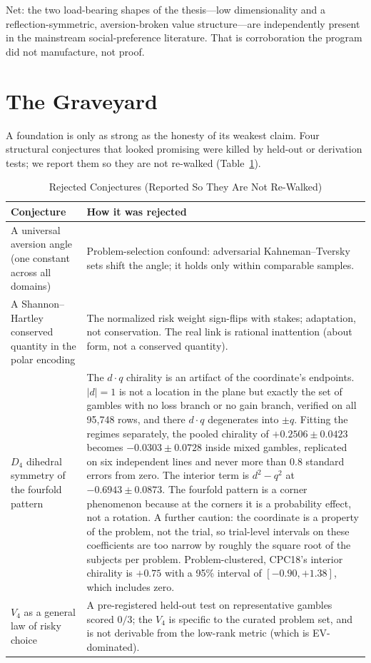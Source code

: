 \documentclass[journal]{IEEEtran}
\begin{document}
Net: the two load-bearing shapes of the thesis---low dimensionality and a reflection-symmetric, aversion-broken value structure---are independently present in the mainstream social-preference literature.
That is corroboration the program did not manufacture, not proof.

\section{The Graveyard}
\label{sec:graveyard}

A foundation is only as strong as the honesty of its weakest claim.
Four structural conjectures that looked promising were killed by held-out or derivation tests; we report them so they are not re-walked (Table~\ref{tab:graveyard}).

\begin{table}[!t]
\renewcommand{\arraystretch}{1.2}
\caption{Rejected Conjectures (Reported So They Are Not Re-Walked)}
\label{tab:graveyard}
\centering
\begin{tabular}{@{}p{} p{}@{}}
\toprule
\textbf{Conjecture} & \textbf{How it was rejected} \\
\midrule
A universal aversion angle (one constant across all domains) & Problem-selection confound: adversarial Kahneman--Tversky sets shift the angle; it holds only within comparable samples. \\
A Shannon--Hartley conserved quantity in the polar encoding & The normalized risk weight sign-flips with stakes; adaptation, not conservation. The real link is rational inattention (about form, not a conserved quantity). \\
$D_4$ dihedral symmetry of the fourfold pattern & The $d\!\cdot\!q$ chirality is an artifact of the coordinate's endpoints. $|d|=1$ is not a location in the plane but exactly the set of gambles with no loss branch or no gain branch, verified on all 95{,}748 rows, and there $d\!\cdot\!q$ degenerates into $\pm q$. Fitting the regimes separately, the pooled chirality of $+0.2506\pm0.0423$ becomes $-0.0303\pm0.0728$ inside mixed gambles, replicated on six independent lines and never more than 0.8 standard errors from zero. The interior term is $d^2-q^2$ at $-0.6943\pm0.0873$. The fourfold pattern is a corner phenomenon because at the corners it is a probability effect, not a rotation. A further caution: the coordinate is a property of the problem, not the trial, so trial-level intervals on these coefficients are too narrow by roughly the square root of the subjects per problem. Problem-clustered, CPC18's interior chirality is $+0.75$ with a 95\% interval of $[-0.90, +1.38]$, which includes zero. \\
$V_4$ as a general law of risky choice & A pre-registered held-out test on representative gambles scored $0/3$; the $V_4$ is specific to the curated problem set, and is not derivable from the low-rank metric (which is EV-dominated). \\
\bottomrule
\end{tabular}
\end{table}
\end{document}
